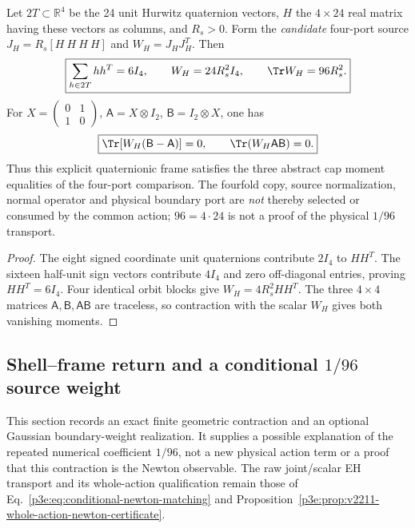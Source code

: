 \documentclass[11pt,a4paper]{article}
\begin{document}
\begin{proposition}
\label{p3g:prop:v245-hurwitz-four-port-moment-comparison}
Let $2T\subset\mathbb R^4$ be the 24 unit Hurwitz quaternion vectors,
$H$ the $4\times24$ real matrix having these vectors as columns, and
$R_s>0$. Form the \emph{candidate} four-port source
$J_H=R_s[H\ H\ H\ H]$ and $W_H=J_HJ_H^T$. Then
\[
 \boxed{\sum_{h\in2T}hh^T=6I_4,\qquad
 W_H=24R_s^2I_4,\qquad \Tr W_H=96R_s^2.}
\]
For $X=\left(\begin{smallmatrix}0&1\\1&0\end{smallmatrix}\right)$,
$\mathsf A=X\otimes I_2$, $\mathsf B=I_2\otimes X$, one has
\[
 \boxed{\Tr[W_H(\mathsf B-\mathsf A)]=0,\qquad
 \Tr(W_H\mathsf A\mathsf B)=0.}
\]
Thus this explicit quaternionic frame satisfies the three abstract
cap moment equalities of the four-port comparison. The fourfold copy,
source normalization, normal operator and physical boundary port are
\emph{not} thereby selected or consumed by the common action;
$96=4\cdot24$ is not a proof of the physical $1/96$ transport.
\end{proposition}
\begin{proof}
The eight signed coordinate unit quaternions contribute $2I_4$
to $HH^T$. The sixteen half-unit sign vectors contribute $4I_4$
and zero off-diagonal entries, proving $HH^T=6I_4$.
Four identical orbit blocks give $W_H=4R_s^2HH^T$.
The three $4\times4$ matrices
$\mathsf A,\mathsf B,\mathsf A\mathsf B$ are traceless,
so contraction with the scalar $W_H$ gives both vanishing moments.
\end{proof}


\subsection{Shell--frame return and a conditional \texorpdfstring{\(1/96\)}{1/96} source weight}
\label{p3g:sec:v252-shell-frame-96}
This section records an exact finite geometric contraction and an optional
Gaussian boundary-weight realization. It supplies a possible explanation of
the repeated numerical coefficient \(1/96\), not a new physical action term
or a proof that this contraction is the Newton observable. The raw
joint/scalar EH transport and its whole-action qualification remain those
of Eq.~\eqref{p3e:eq:conditional-newton-matching} and
Proposition~\ref{p3e:prop:v2211-whole-action-newton-certificate}.
\end{document}
